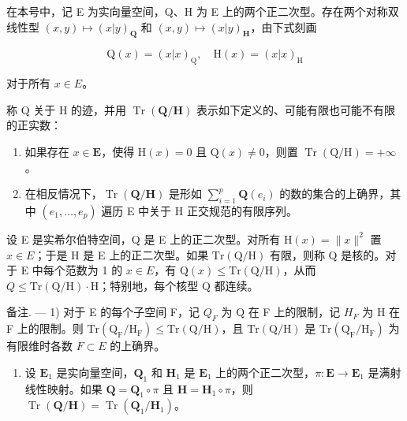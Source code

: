 
在本号中，记 E 为实向量空间，Q、H 为 E 上的两个正二次型。存在两个对称双线性型 \((x,y)\mapsto(x|y)_{\mathbf{Q}}\) 和 \((x,y)\mapsto(x|y)_{\mathbf{H}}\)，由下式刻画

\[
\mathrm{Q} (x) = (x | x) _ {\mathrm{Q}}, \quad \mathrm{H} (x) = (x | x) _ {\mathrm{H}}
\]

对于所有 \(x \in E\)。

称 Q 关于 H 的迹，并用 \(\operatorname{Tr}\left(\mathbf{Q}/\mathbf{H}\right)\) 表示如下定义的、可能有限也可能不有限的正实数：

\begin{enumerate}
\def\labelenumi{\alph{enumi})}
\item
  如果存在 \(x \in \mathbf{E}\)，使得 \(\mathrm{H}(x) = 0\) 且 \(\mathrm{Q}(x) \neq 0\)，则置 \(\operatorname{Tr}(\mathrm{Q} / \mathrm{H}) = +\infty\)。
\item
  在相反情况下，\(\operatorname{Tr}(\mathbf{Q}/\mathbf{H})\) 是形如 \(\sum_{i=1}^{p} \mathbf{Q}(e_i)\) 的数的集合的上确界，其中 \((e_1, \ldots, e_p)\) 遍历 E 中关于 H 正交规范的有限序列。
\end{enumerate}

设 E 是实希尔伯特空间，Q 是 E 上的正二次型。对所有 \(\mathrm{H}(x)=\|x\|^{2}\) 置 \(x\in E\)；于是 H 是 E 上的正二次型。如果 \(\mathrm{Tr}\left(\mathrm{Q}/\mathrm{H}\right)\) 有限，则称 Q 是核的。对于 E 中每个范数为 1 的 \(x\in E\)，有 \(\mathrm{Q}(x)\leqslant\mathrm{Tr}\left(\mathrm{Q}/\mathrm{H}\right)\)，从而 \(Q\leqslant\mathrm{Tr}\left(\mathrm{Q}/\mathrm{H}\right)\cdot\mathrm{H}\)；特别地，每个核型 Q 都连续。

备注. --- 1) 对于 E 的每个子空间 F，记 \(Q_{F}\) 为 Q 在 F 上的限制，记 \(H_{F}\) 为 H 在 F 上的限制。则 \(\mathrm{Tr}\left(\mathrm{Q}_{\mathrm{F}}/\mathrm{H}_{\mathrm{F}}\right) \leqslant \mathrm{Tr}\left(\mathrm{Q}/\mathrm{H}\right)\)，且 \(\mathrm{Tr}\left(\mathrm{Q}/\mathrm{H}\right)\) 是 \(\mathrm{Tr}\left(\mathrm{Q}_{\mathrm{F}}/\mathrm{H}_{\mathrm{F}}\right)\) 为有限维时各数 \(F \subset E\) 的上确界。

\begin{enumerate}
\def\labelenumi{\arabic{enumi})}
\setcounter{enumi}{1}
\tightlist
\item
  设 \(\mathbf{E}_1\) 是实向量空间，\(\mathbf{Q}_1\) 和 \(\mathbf{H}_1\) 是 \(\mathbf{E}_1\) 上的两个正二次型，\(\pi: \mathbf{E} \to \mathbf{E}_1\) 是满射线性映射。如果 \(\mathbf{Q} = \mathbf{Q}_1 \circ \pi\) 且 \(\mathbf{H} = \mathbf{H}_1 \circ \pi\)，则 \(\operatorname{Tr}(\mathbf{Q} / \mathbf{H}) = \operatorname{Tr}(\mathbf{Q}_1 / \mathbf{H}_1)\)。
\end{enumerate}

